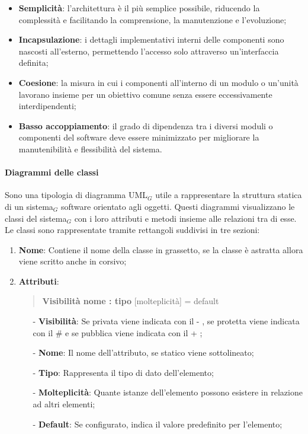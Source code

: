 \documentclass[10pt]{article}
\begin{document}
\begin{justify}
\begin{itemize}
            \item \textbf{Semplicità}: l'architettura è il più semplice possibile, riducendo la complessità e facilitando la comprensione, la manutenzione e l'evoluzione;
            \item \textbf{Incapsulazione}: i dettagli implementativi interni delle componenti sono nascosti all'esterno, permettendo l'accesso solo attraverso un'interfaccia definita;
            \item \textbf{Coesione}: la misura in cui i componenti all'interno di un modulo o un'unità lavorano insieme per un obiettivo comune senza essere eccessivamente interdipendenti;
            \item \textbf{Basso accoppiamento}: il grado di dipendenza tra i diversi moduli o componenti del software deve essere minimizzato per migliorare la manutenibilità e flessibilità del sistema.
        \end{itemize}

        \paragraph{Diagrammi delle classi}
        Sono una tipologia di diagramma UML$_G$ utile a rappresentare la struttura statica di un sistema$_G$ software orientato agli oggetti. Questi diagrammi visualizzano le classi del sistema$_G$ con i loro attributi e metodi insieme alle relazioni tra di esse.\\
        Le classi sono rappresentate tramite rettangoli suddivisi in tre sezioni:
        \begin{enumerate}
            \item \textbf{Nome}: Contiene il nome della classe in grassetto, se la classe è astratta allora viene scritto anche in corsivo;
            \item \textbf{Attributi}:
            \begin{quote}
                \textbf{Visibilità nome : tipo} [molteplicità] = default
            \end{quote}
            \begin{itemize}
                \item [-] \textbf{Visibilità}: Se privata viene indicata con il - , se protetta viene indicata con il \# e se pubblica viene indicata con il + ;
                \item [-] \textbf{Nome}: Il nome dell'attributo, se statico viene sottolineato;
                \item [-] \textbf{Tipo}: Rappresenta il tipo di dato dell'elemento;
                \item [-] \textbf{Molteplicità}: Quante istanze dell'elemento possono esistere in relazione ad altri elementi;
                \item [-] \textbf{Default}: Se configurato, indica il valore predefinito per l'elemento;
            \end{itemize}


\end{enumerate}
\end{justify}
\end{document}
